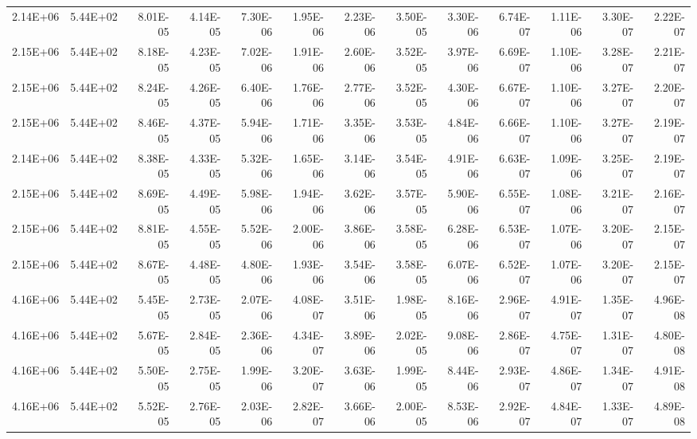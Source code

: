 \begin{tabular}{rrrrrrrrrrrrr}
2.14E+06 & 5.44E+02 & 8.01E-05 & 4.14E-05 & 7.30E-06 & 1.95E-06 & 2.23E-06 & 3.50E-05 & 3.30E-06 & 6.74E-07 & 1.11E-06 & 3.30E-07 & 2.22E-07 \\
2.15E+06 & 5.44E+02 & 8.18E-05 & 4.23E-05 & 7.02E-06 & 1.91E-06 & 2.60E-06 & 3.52E-05 & 3.97E-06 & 6.69E-07 & 1.10E-06 & 3.28E-07 & 2.21E-07 \\
2.15E+06 & 5.44E+02 & 8.24E-05 & 4.26E-05 & 6.40E-06 & 1.76E-06 & 2.77E-06 & 3.52E-05 & 4.30E-06 & 6.67E-07 & 1.10E-06 & 3.27E-07 & 2.20E-07 \\
2.15E+06 & 5.44E+02 & 8.46E-05 & 4.37E-05 & 5.94E-06 & 1.71E-06 & 3.35E-06 & 3.53E-05 & 4.84E-06 & 6.66E-07 & 1.10E-06 & 3.27E-07 & 2.19E-07 \\
2.14E+06 & 5.44E+02 & 8.38E-05 & 4.33E-05 & 5.32E-06 & 1.65E-06 & 3.14E-06 & 3.54E-05 & 4.91E-06 & 6.63E-07 & 1.09E-06 & 3.25E-07 & 2.19E-07 \\
2.15E+06 & 5.44E+02 & 8.69E-05 & 4.49E-05 & 5.98E-06 & 1.94E-06 & 3.62E-06 & 3.57E-05 & 5.90E-06 & 6.55E-07 & 1.08E-06 & 3.21E-07 & 2.16E-07 \\
2.15E+06 & 5.44E+02 & 8.81E-05 & 4.55E-05 & 5.52E-06 & 2.00E-06 & 3.86E-06 & 3.58E-05 & 6.28E-06 & 6.53E-07 & 1.07E-06 & 3.20E-07 & 2.15E-07 \\
2.15E+06 & 5.44E+02 & 8.67E-05 & 4.48E-05 & 4.80E-06 & 1.93E-06 & 3.54E-06 & 3.58E-05 & 6.07E-06 & 6.52E-07 & 1.07E-06 & 3.20E-07 & 2.15E-07 \\
4.16E+06 & 5.44E+02 & 5.45E-05 & 2.73E-05 & 2.07E-06 & 4.08E-07 & 3.51E-06 & 1.98E-05 & 8.16E-06 & 2.96E-07 & 4.91E-07 & 1.35E-07 & 4.96E-08 \\
4.16E+06 & 5.44E+02 & 5.67E-05 & 2.84E-05 & 2.36E-06 & 4.34E-07 & 3.89E-06 & 2.02E-05 & 9.08E-06 & 2.86E-07 & 4.75E-07 & 1.31E-07 & 4.80E-08 \\
4.16E+06 & 5.44E+02 & 5.50E-05 & 2.75E-05 & 1.99E-06 & 3.20E-07 & 3.63E-06 & 1.99E-05 & 8.44E-06 & 2.93E-07 & 4.86E-07 & 1.34E-07 & 4.91E-08 \\
4.16E+06 & 5.44E+02 & 5.52E-05 & 2.76E-05 & 2.03E-06 & 2.82E-07 & 3.66E-06 & 2.00E-05 & 8.53E-06 & 2.92E-07 & 4.84E-07 & 1.33E-07 & 4.89E-08 \\
\end{tabular}
